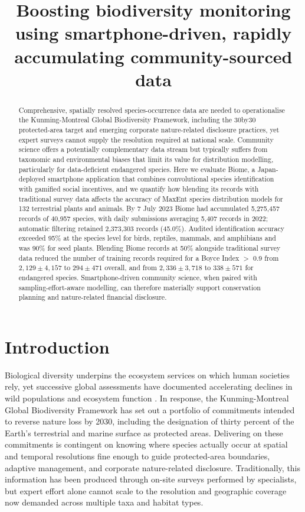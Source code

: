 \documentclass[11pt]{article}
\title{Boosting biodiversity monitoring using smartphone-driven, rapidly accumulating community-sourced data}
\author{}
\date{}
\begin{document}
\maketitle

\begin{abstract}
Comprehensive, spatially resolved species-occurrence data are needed to operationalise the Kunming-Montreal Global Biodiversity Framework, including the 30by30 protected-area target and emerging corporate nature-related disclosure practices, yet expert surveys cannot supply the resolution required at national scale. Community science offers a potentially complementary data stream but typically suffers from taxonomic and environmental biases that limit its value for distribution modelling, particularly for data-deficient endangered species. Here we evaluate Biome, a Japan-deployed smartphone application that combines convolutional species identification with gamified social incentives, and we quantify how blending its records with traditional survey data affects the accuracy of MaxEnt species distribution models for 132 terrestrial plants and animals. By 7 July 2023 Biome had accumulated 5{,}275{,}457 records of 40{,}957 species, with daily submissions averaging 5{,}407 records in 2022; automatic filtering retained 2{,}373{,}303 records (45.0\%). Audited identification accuracy exceeded 95\% at the species level for birds, reptiles, mammals, and amphibians and was 90\% for seed plants. Blending Biome records at 50\% alongside traditional survey data reduced the number of training records required for a Boyce Index $>$ 0.9 from $2{,}129 \pm 4{,}157$ to $294 \pm 471$ overall, and from $2{,}336 \pm 3{,}718$ to $338 \pm 571$ for endangered species. Smartphone-driven community science, when paired with sampling-effort-aware modelling, can therefore materially support conservation planning and nature-related financial disclosure.
\end{abstract}

\section{Introduction}

Biological diversity underpins the ecosystem services on which human societies rely, yet successive global assessments have documented accelerating declines in wild populations and ecosystem function \citep{ipbes2019global,newbold2015land}. In response, the Kunming-Montreal Global Biodiversity Framework has set out a portfolio of commitments intended to reverse nature loss by 2030, including the designation of thirty percent of the Earth's terrestrial and marine surface as protected areas. Delivering on these commitments is contingent on knowing where species actually occur at spatial and temporal resolutions fine enough to guide protected-area boundaries, adaptive management, and corporate nature-related disclosure. Traditionally, this information has been produced through on-site surveys performed by specialists, but expert effort alone cannot scale to the resolution and geographic coverage now demanded across multiple taxa and habitat types.
\end{document}
